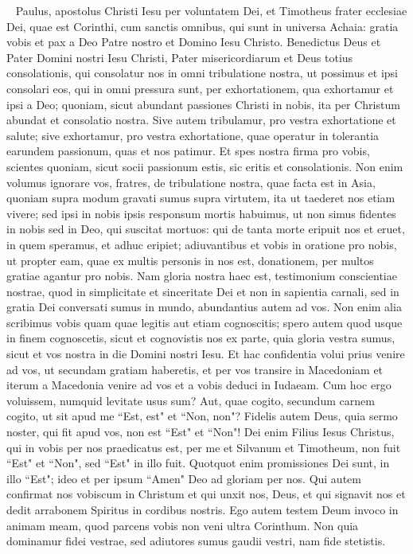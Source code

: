 
\begin{biblechapter}   
\verse Paulus, apostolus Christi Iesu per voluntatem Dei, et Timotheus frater ecclesiae Dei, quae est Corinthi, cum sanctis omnibus, qui sunt in universa Achaia: 
\verse gratia vobis et pax a Deo Patre nostro et Domino Iesu Christo. 
\verse Benedictus Deus et Pater Domini nostri Iesu Christi, Pater misericordiarum et Deus totius consolationis, 
\verse qui consolatur nos in omni tribulatione nostra, ut possimus et ipsi consolari eos, qui in omni pressura sunt, per exhortationem, qua exhortamur et ipsi a Deo; 
\verse quoniam, sicut abundant passiones Christi in nobis, ita per Christum abundat et consolatio nostra. 
\verse Sive autem tribulamur, pro vestra exhortatione et salute; sive exhortamur, pro vestra exhortatione, quae operatur in tolerantia earundem passionum, quas et nos patimur. 
\verse Et spes nostra firma pro vobis, scientes quoniam, sicut socii passionum estis, sic eritis et consolationis. 
\verse Non enim volumus ignorare vos, fratres, de tribulatione nostra, quae facta est in Asia, quoniam supra modum gravati sumus supra virtutem, ita ut taederet nos etiam vivere; 
\verse sed ipsi in nobis ipsis responsum mortis habuimus, ut non simus fidentes in nobis sed in Deo, qui suscitat mortuos: 
\verse qui de tanta morte eripuit nos et eruet, in quem speramus, et adhuc eripiet; 
\verse adiuvantibus et vobis in oratione pro nobis, ut propter eam, quae ex multis personis in nos est, donationem, per multos gratiae agantur pro nobis. 
\verse Nam gloria nostra haec est, testimonium conscientiae nostrae, quod in simplicitate et sinceritate Dei et non in sapientia carnali, sed in gratia Dei conversati sumus in mundo, abundantius autem ad vos. 
\verse Non enim alia scribimus vobis quam quae legitis aut etiam cognoscitis; spero autem quod usque in finem cognoscetis, 
\verse sicut et cognovistis nos ex parte, quia gloria vestra sumus, sicut et vos nostra in die Domini nostri Iesu. 
\verse Et hac confidentia volui prius venire ad vos, ut secundam gratiam haberetis, 
\verse et per vos transire in Macedoniam et iterum a Macedonia venire ad vos et a vobis deduci in Iudaeam. 
\verse Cum hoc ergo voluissem, numquid levitate usus sum? Aut, quae cogito, secundum carnem cogito, ut sit apud me “Est, est" et “Non, non"? 
\verse Fidelis autem Deus, quia sermo noster, qui fit apud vos, non est “Est" et “Non"! 
\verse Dei enim Filius Iesus Christus, qui in vobis per nos praedicatus est, per me et Silvanum et Timotheum, non fuit “Est" et “Non", sed “Est" in illo fuit. 
\verse Quotquot enim promissiones Dei sunt, in illo “Est"; ideo et per ipsum “Amen" Deo ad gloriam per nos. 
\verse Qui autem confirmat nos vobiscum in Christum et qui unxit nos, Deus, 
\verse et qui signavit nos et dedit arrabonem Spiritus in cordibus nostris. 
\verse Ego autem testem Deum invoco in animam meam, quod parcens vobis non veni ultra Corinthum. 
\verse Non quia dominamur fidei vestrae, sed adiutores sumus gaudii vestri, nam fide stetistis. 
\end{biblechapter}

